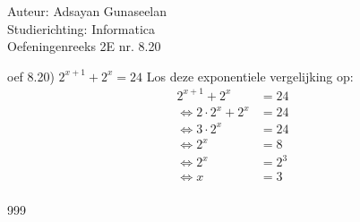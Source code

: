\documentclass[a4paper]{article}
\begin{document}
\noindent \large Auteur: Adsayan Gunaseelan \\
\noindent \large Studierichting: Informatica\\
\noindent \large Oefeningenreeks 2E nr. 8.20\\

\medskip

\normalsize
oef 8.20) $2^{x+1}+2^x = 24$ Los deze exponentiele vergelijking op:\\
\begin{align*}
 2^{x+1}+2^x &= 24\\
\Leftrightarrow 2\cdot2^x +2^x &= 24 \\
\Leftrightarrow 3\cdot2^x &= 24 \\
\Leftrightarrow 2^x &= 8 \\
\Leftrightarrow 2^x &= 2^3\\
\Leftrightarrow x &= 3\\
\end{align*}

\begin{thebibliography}{999}
\end{thebibliography}
\end{document}
